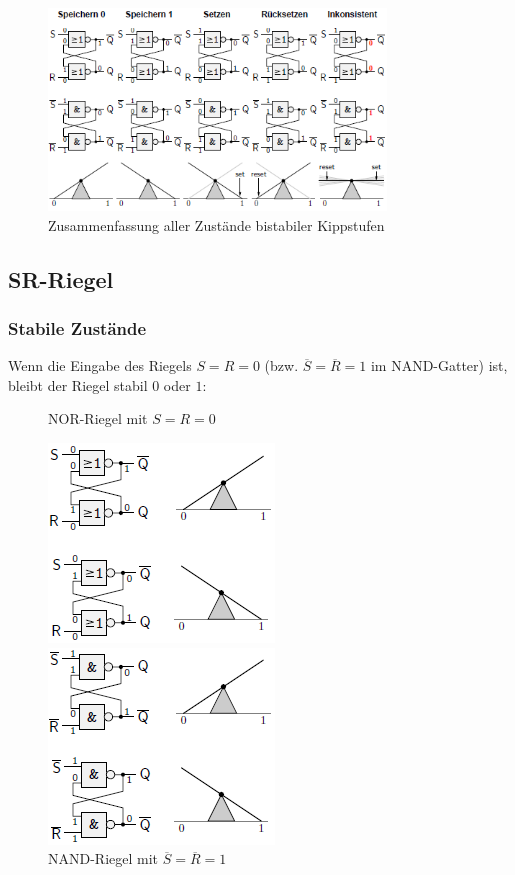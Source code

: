 \documentclass[12pt]{report}
\begin{document}
\begin{figure}[H]
  \caption{Zusammenfassung aller Zustände bistabiler Kippstufen}
  \centering
  \includegraphics[width=0.8\textwidth]{riegel_zusammenfassung}
\end{figure}

\subsection{SR-Riegel}

\subsubsection{Stabile Zustände}
Wenn die Eingabe des Riegels $S=R=0$ (bzw. $\overline{S}=\overline{R}=1$ im NAND-Gatter) ist, bleibt der Riegel stabil $0$ oder $1$:

\begin{figure}[H]
  \begin{minipage}[t]{0.48\textwidth}
    \caption{NOR-Riegel mit $S=R=0$}
    \centering
    \includegraphics{riegel_nor_stabil}
  \end{minipage}
  \hfill
  \begin{minipage}[t]{0.48\textwidth}
    \caption{NAND-Riegel mit $\overline{S}=\overline{R}=1$}
    \centering
    \includegraphics{riegel_nand_stabil}
  \end{minipage}
\end{figure}
\end{document}
